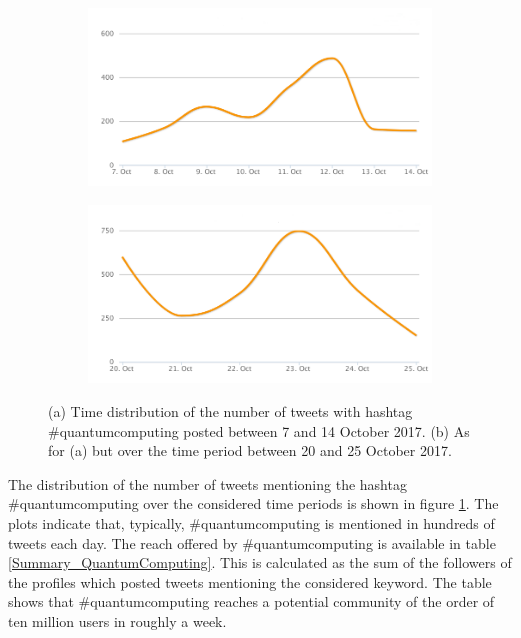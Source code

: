 \begin{figure}
 \centering
 \begin{subfigure}[t]{0.95\textwidth}
   \includegraphics[width=1\linewidth]{Images/FirstSearch_QuantumComputing.png}
   \caption{} 
 \end{subfigure}

 \begin{subfigure}[t]{0.95\textwidth}
   \includegraphics[width=1\linewidth]{Images/SecondSearch_QuantumComputing.png}
   \caption{}
 \end{subfigure}
 \caption{(a) Time distribution of the number of tweets with hashtag \#quantumcomputing posted between 7 and 14 October 2017. (b) As for (a) but over the time period between 20 and 25 October 2017.} 
 \label{First-SecondSearch_QuantumComputing}
\end{figure}

The distribution of the number of tweets mentioning the hashtag \#quantumcomputing over the considered time periods is shown in figure \ref{First-SecondSearch_QuantumComputing}. The plots indicate that, typically, \#quantumcomputing is mentioned in hundreds of tweets each day. The reach offered by \#quantumcomputing is available in table \ref{Summary_QuantumComputing}. This is calculated as the sum of the followers of the profiles which posted tweets mentioning the considered keyword. The table shows that \#quantumcomputing reaches a potential community of the order of ten million users in roughly a week.


